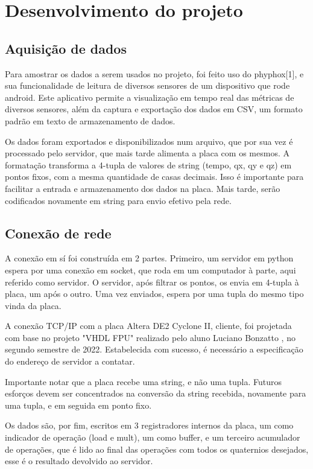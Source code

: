 \documentclass [12pt,oneside] {article}
\begin{document}
\section{Desenvolvimento do projeto}

\subsection{Aquisição de dados}

	Para amostrar os dados a serem usados no projeto, foi feito
uso do phyphox[1], e sua funcionalidade de leitura de diversos
sensores de um dispositivo que rode android. Este aplicativo permite a
visualização em tempo real das métricas de diversos sensores, além da
captura e exportação dos dados em CSV, um formato padrão em texto de
armazenamento de dados.

	Os dados foram exportados e disponibilizados num arquivo, que
por sua vez é processado pelo servidor, que mais tarde alimenta a
placa com os mesmos. A formatação transforma a 4-tupla de valores de
string (tempo, qx, qy e qz) em pontos fixos, com a mesma
quantidade de casas decimais. Isso é importante para facilitar a
entrada e armazenamento dos dados na placa. Mais tarde, serão
codificados novamente em string para envio efetivo pela rede.

\subsection{Conexão de rede}

	A conexão em sí foi construída em 2 partes. Primeiro, um
servidor em python espera por uma conexão em socket, que roda em um
computador à parte, aqui referido como servidor. O servidor, após filtrar
os pontos, os envia em 4-tupla à placa, um após o outro. Uma vez
enviados, espera por uma tupla do mesmo tipo vinda da placa.

	A conexão TCP/IP com a placa Altera DE2 Cyclone II, cliente,
foi projetada com base no projeto "VHDL FPU" realizado pelo aluno
Luciano Bonzatto , no segundo semestre de 2022. Estabelecida com
sucesso, é necessário a especificação do endereço de servidor a
contatar.

	Importante notar que a placa recebe uma string, e não uma
tupla. Futuros esforços devem ser concentrados na conversão da string
recebida, novamente para uma tupla, e em seguida em ponto fixo.

	Os dados são, por fim, escritos em 3 registradores internos da
placa, um como indicador de operação (load e mult), um como buffer, e
um terceiro acumulador de operações, que é lido ao final das operações
com todos os quaternios desejados, esse é o resultado devolvido ao servidor.
\end{document}

